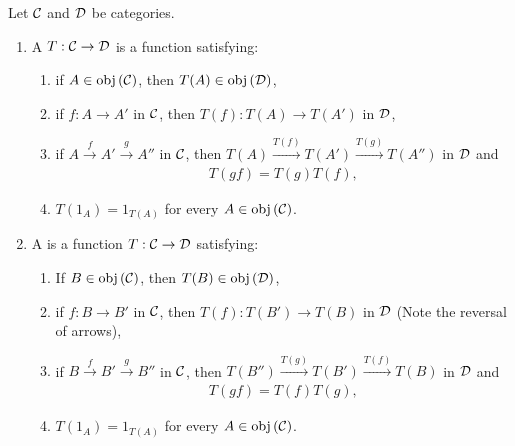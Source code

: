     \begin{definition}
        Let $\mathcal{C}$ and $\mathcal{D}$ be categories. 
        \begin{enumerate}[label = (\arabic*)]
            \item A  $T:\mathcal{C} \rightarrow \mathcal{D}$ is a function satisfying:
                \begin{enumerate}[label = (\roman*)]
                    \item if $A \in \operatorname{obj}{(\mathcal{C})}$, then $T(A) \in \operatorname{obj}{(\mathcal{D})}$,
                    \item if $f:A \rightarrow A'$ in $\mathcal{C}$, then $T(f):T(A) \rightarrow T(A')$ in $\mathcal{D}$,
                    \item if $A \xrightarrow{f} A' \xrightarrow{g} A''$ in $\mathcal{C}$, then $T(A) \xrightarrow{T(f)} T(A') \xrightarrow{T(g)} T(A'')$ in $\mathcal{D}$ and
                        \begin{equation*}
                        \begin{split}
                            T(gf) = T(g)T(f),
                        \end{split}
                        \end{equation*}
                    \item $T(1_A) = 1_{T(A)}$ for every $A \in \operatorname{obj}{(\mathcal{C})}$.
                \end{enumerate}
            \item A  is a function $T:\mathcal{C} \rightarrow \mathcal{D}$ satisfying:
                \begin{enumerate}[label = (\roman*)]
                    \item If $B \in \operatorname{obj}{(\mathcal{C})}$, then $T(B) \in \operatorname{obj}{(\mathcal{D})}$,
                    \item if $f: B \rightarrow B'$ in $\mathcal{C}$, then $T(f): T(B') \rightarrow T(B)$ in $\mathcal{D}$ (Note the reversal of arrows),
                    \item if $B \xrightarrow{f} B' \xrightarrow{g} B''$ in $\mathcal{C}$, then $T(B'') \xrightarrow{T(g)} T(B') \xrightarrow{T(f)} T(B)$ in $\mathcal{D}$ and 
                        \begin{equation*}
                        \begin{split}
                            T(gf) = T(f)T(g),
                        \end{split}
                        \end{equation*}
                    \item $T(1_A) = 1_{T(A)}$ for every $A \in \operatorname{obj}{(\mathcal{C})}$.
                \end{enumerate}
                
        \end{enumerate}
    \end{definition}

